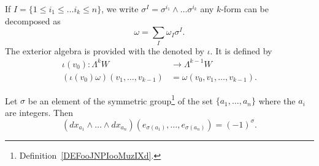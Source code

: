 If $I=\{1\leq i_1\leq\ldots i_k\leq n\}$, we write $\sigma^I=\sigma^{i_1}\wedge\ldots\sigma^{i_k}$ any $k$-form can be decomposed as
\[
	\omega=\sum_{I}\omega_I\sigma^I.
\]
The exterior algebra is provided with the  denoted by $\iota$. It is defined by\label{pg_DefProdExt}
\begin{equation}
	\begin{aligned}
		\iota(v_0)\colon\Lambda^kW             & \to \Lambda^{k-1}W               \\
		(\iota(v_0)\omega)(v_1,\ldots,v_{k-1}) & =\omega(v_0,v_1,\ldots,v_{k-1}).
	\end{aligned}
\end{equation}

\begin{lemma}
	Let \( \sigma\) be an element of the symmetric group\footnote{Definition~\ref{DEFooJNPIooMuzIXd}.} of the set \( \{ a_1,\ldots, a_n \}\) where the \( a_i\) are integers. Then
	\begin{equation}
		(dx_{a_1}\wedge\ldots \wedge dx_{a_n})(e_{\sigma(a_1)},\ldots, e_{\sigma(a_n)})=(-1)^{\sigma}.
	\end{equation}
\end{lemma}

